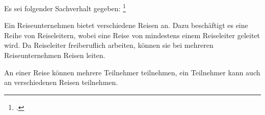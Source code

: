 \documentclass{bschlangaul-aufgabe}
\begin{document}

Es sei folgender Sachverhalt gegeben:
\footcite{examen:46116:2010:03}

Ein Reiseunternehmen bietet verschiedene Reisen an. Dazu beschäftigt es
eine Reihe von Reiseleitern, wobei eine Reise von mindestens einem
Reiseleiter geleitet wird. Da Reiseleiter freiberuflich arbeiten, können
sie bei mehreren Reiseunternehmen Reisen leiten.

An einer Reise können mehrere Teilnehmer teilnehmen, ein Teilnehmer kann
auch an verschiedenen Reisen teilnehmen.
\end{document}

